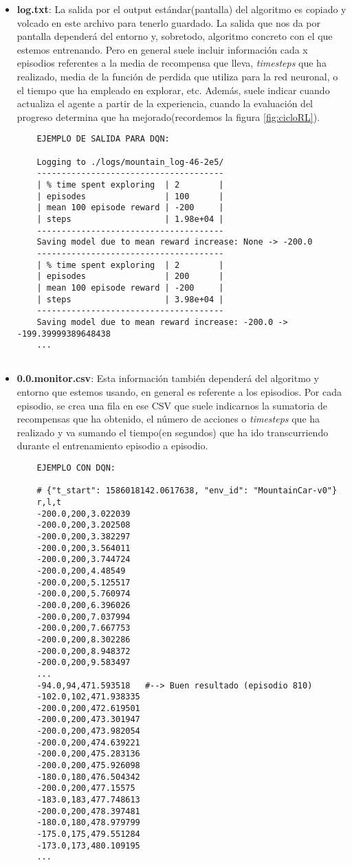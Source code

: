 \documentclass[11pt,fleqn]{book} %
\begin{document}
\begin{itemize}
	\item \textbf{log.txt}: La salida por el output estándar(pantalla) del algoritmo es copiado y volcado en este archivo para tenerlo guardado. La salida que nos da por pantalla dependerá del entorno y, sobretodo, algoritmo concreto con el que estemos entrenando. Pero en general suele incluir información cada x episodios referentes a la media de recompensa que lleva, \textit{timesteps} que ha realizado, media de la función de perdida que utiliza para la red neuronal, o el tiempo que ha empleado en explorar, etc. Además, suele indicar cuando actualiza el agente a partir de la experiencia, cuando la evaluación del progreso determina que ha mejorado(recordemos la figura \ref{fig:cicloRL}).\\
	
	\begin{verbatim}
	EJEMPLO DE SALIDA PARA DQN:
	
	Logging to ./logs/mountain_log-46-2e5/
	--------------------------------------
	| % time spent exploring  | 2        |
	| episodes                | 100      |
	| mean 100 episode reward | -200     |
	| steps                   | 1.98e+04 |
	--------------------------------------
	Saving model due to mean reward increase: None -> -200.0
	--------------------------------------
	| % time spent exploring  | 2        |
	| episodes                | 200      |
	| mean 100 episode reward | -200     |
	| steps                   | 3.98e+04 |
	--------------------------------------
	Saving model due to mean reward increase: -200.0 -> -199.39999389648438
	...
	
	\end{verbatim}
	
	\item \textbf{0.0.monitor.csv}: Esta información también dependerá del algoritmo y entorno que estemos usando, en general es referente a los episodios. Por cada episodio, se crea una fila en ese CSV que suele indicarnos la sumatoria de recompensas que ha obtenido, el número de acciones o \textit{timesteps} que ha realizado y va sumando el tiempo(en segundos) que ha ido transcurriendo durante el entrenamiento episodio a episodio.\\
	
	\begin{verbatim}
	EJEMPLO CON DQN:
	
	# {"t_start": 1586018142.0617638, "env_id": "MountainCar-v0"} 
	r,l,t
	-200.0,200,3.022039
	-200.0,200,3.202508
	-200.0,200,3.382297
	-200.0,200,3.564011
	-200.0,200,3.744724
	-200.0,200,4.48549
	-200.0,200,5.125517
	-200.0,200,5.760974
	-200.0,200,6.396026
	-200.0,200,7.037994
	-200.0,200,7.667753
	-200.0,200,8.302286
	-200.0,200,8.948372
	-200.0,200,9.583497
	...
	-94.0,94,471.593518   #--> Buen resultado (episodio 810)
	-102.0,102,471.938335
	-200.0,200,472.619501
	-200.0,200,473.301947
	-200.0,200,473.982054
	-200.0,200,474.639221
	-200.0,200,475.283136
	-200.0,200,475.926098
	-180.0,180,476.504342
	-200.0,200,477.15575
	-183.0,183,477.748613
	-200.0,200,478.397481
	-180.0,180,478.979799
	-175.0,175,479.551284
	-173.0,173,480.109195
	...
	\end{verbatim}
	

\end{itemize}
\end{document}
